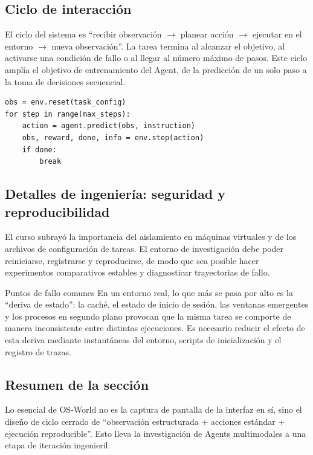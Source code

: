 \subsection{Ciclo de interacción}
El ciclo del sistema es ``recibir observación $\rightarrow$ planear acción $\rightarrow$ ejecutar en el entorno $\rightarrow$ nueva observación''. La tarea termina al alcanzar el objetivo, al activarse una condición de fallo o al llegar al número máximo de pasos. Este ciclo amplía el objetivo de entrenamiento del Agent, de la predicción de un solo paso a la toma de decisiones secuencial.

\begin{lstlisting}[caption={Ciclo de interacción simplificado de un Agent multimodal en OS-World}]
obs = env.reset(task_config)
for step in range(max_steps):
    action = agent.predict(obs, instruction)
    obs, reward, done, info = env.step(action)
    if done:
        break
\end{lstlisting}

\subsection{Detalles de ingeniería: seguridad y reproducibilidad}
El curso subrayó la importancia del aislamiento en máquinas virtuales y de los archivos de configuración de tareas. El entorno de investigación debe poder reiniciarse, registrarse y reproducirse, de modo que sea posible hacer experimentos comparativos estables y diagnosticar trayectorias de fallo.

\begin{warningbox}{Puntos de fallo comunes}
En un entorno real, lo que más se pasa por alto es la ``deriva de estado'': la caché, el estado de inicio de sesión, las ventanas emergentes y los procesos en segundo plano provocan que la misma tarea se comporte de manera inconsistente entre distintas ejecuciones. Es necesario reducir el efecto de esta deriva mediante instantáneas del entorno, scripts de inicialización y el registro de trazas.
\end{warningbox}

\subsection{Resumen de la sección}
Lo esencial de OS-World no es la captura de pantalla de la interfaz en sí, sino el diseño de ciclo cerrado de ``observación estructurada + acciones estándar + ejecución reproducible''. Esto lleva la investigación de Agents multimodales a una etapa de iteración ingenieril.
